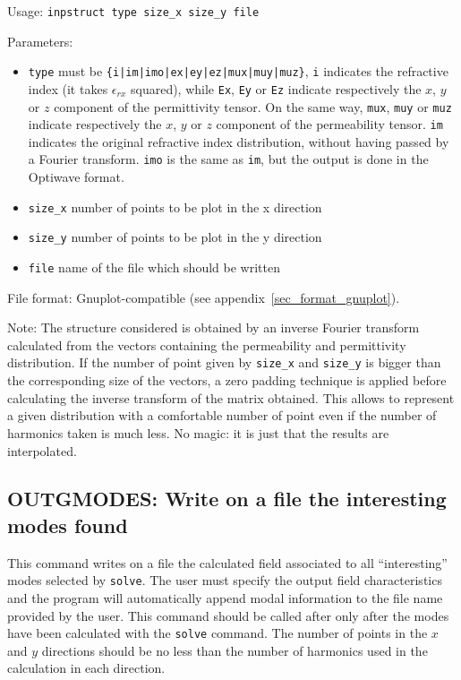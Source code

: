     Usage: \lstinline!inpstruct type size_x size_y file!
    
    
    Parameters:
    \begin{itemize}
    \item
    \lstinline!type!    must be \lstinline!{i|im|imo|ex|ey|ez|mux|muy|muz}!, \lstinline!i! indicates the 
            refractive index
            (it takes $\epsilon_{rx}$ squared), while \lstinline!Ex!, \lstinline!Ey! or \lstinline!Ez! indicate respectively the
            $x$, $y$ or $z$ component of the permittivity tensor. On the same way,
            \lstinline!mux!, \lstinline!muy! or \lstinline!muz! indicate respectively the $x$, $y$ or $z$ component of the 
            permeability tensor. \lstinline!im! indicates the original refractive index distribution, without having passed by a Fourier transform. \lstinline!imo! is the same as \lstinline!im!, but the output is done in the Optiwave format.
    \item
    \lstinline!size_x!  number of points to be plot in the x direction
    \item
    \lstinline!size_y!  number of points to be plot in the y direction
    \item
    \lstinline!file!    name of the file which should be written
    \end{itemize}
    
File format: Gnuplot-compatible (see appendix~\ref{sec_format_gnuplot}).

Note: The structure considered is obtained by an inverse Fourier transform 
calculated from the vectors containing the permeability and permittivity
distribution. If the number of point given by \lstinline!size_x! and \lstinline!size_y! is bigger than 
the corresponding size of the vectors, a zero padding technique is applied 
before calculating the inverse transform of the matrix obtained. This allows to
represent a given distribution with a comfortable number of point even if the
number of harmonics taken is much less. No magic: it is just that the results
are interpolated.

\subsection{OUTGMODES: Write on a file the interesting modes found}
\label{subsec_outgmodes}
    This command writes on a file the calculated field associated to all ``interesting'' modes selected by \lstinline!solve!.
     The user must specify the output field characteristics and the
        program will automatically append modal information to the file name 
        provided by the user. This command should be called after only after the modes have been calculated with the \lstinline!solve! command. The number of points in the $x$ and $y$ directions should be no less than the number of harmonics used in the calculation in each direction.
    
